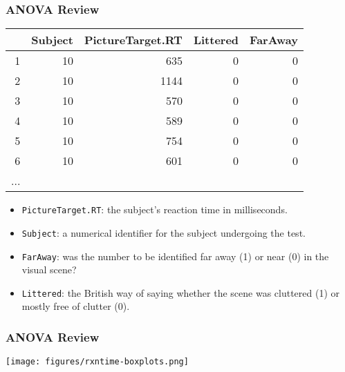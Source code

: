 \documentclass[slidestop,compress,mathserif,12pt,t,professionalfonts,xcolor=table]{beamer}
\begin{document}

\begin{frame}[fragile]
  \frametitle{ANOVA Review}
  
\begin{center}
{\small
\begin{tabular}{rrrrr}
  \hline
 & Subject & PictureTarget.RT & Littered & FarAway \\ 
  \hline
1 &  10 & 635 &   0 &   0 \\ 
  2 &  10 & 1144 &   0 &   0 \\ 
  3 &  10 & 570 &   0 &   0 \\ 
  4 &  10 & 589 &   0 &   0 \\ 
  5 &  10 & 754 &   0 &   0 \\ 
  6 &  10 & 601 &   0 &   0 \\ 
  ... \\
   \hline
\end{tabular}
}
\end{center}

\small
\begin{itemize}
\item \texttt{PictureTarget.RT}: the subject's reaction time in milliseconds.
\item \texttt{Subject}: a numerical identifier for the subject undergoing the test.
\item \texttt{FarAway}: was the number to be identified far away (1) or near (0) in the visual scene?
\item \texttt{Littered}: the British way of saying whether the scene was cluttered (1) or mostly free of clutter (0).
\end{itemize}

\end{frame}



\begin{frame}
  \frametitle{ANOVA Review}


  \begin{center}
  \texttt{[image: figures/rxntime-boxplots.png]}
  \end{center}

\end{frame}


\end{document}
